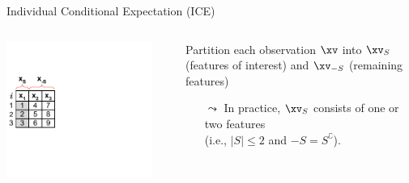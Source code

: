 \documentclass[11pt,compress,t,notes=noshow, aspectratio=169, xcolor=table]{beamer}
\begin{document}
\begin{frame}[c]{Individual Conditional Expectation (ICE) }

\begin{columns}[T]
\begin{column}{0.16\textwidth} %
\includegraphics[page=1, trim=0cm 0.35cm 4.53cm 0.35cm, clip, width=0.9\textwidth]{../../figure_man/ice_plot_demo}
\end{column}
\begin{column}{0.84\textwidth}


Partition each observation $\xv$ into $\xv_S$ (features of interest) and $\xv_{-S}$ (remaining features)
\begin{itemize}
    \item[$\leadsto$] In practice, $\xv_S$ consists of one or two features \\ (i.e., $|S| \leq 2$ and ${-S} = S^\complement$).
\end{itemize}


\end{column}
\end{columns}
\end{frame}
\end{document}
